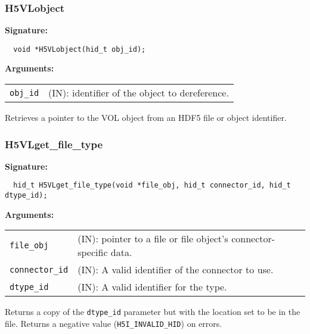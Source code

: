 \subsubsection{H5VLobject}
\begin{mdframed}[style=bgbox]
\textbf{Signature:}
\begin{lstlisting}
  void *H5VLobject(hid_t obj_id); 
\end{lstlisting}
\textbf{Arguments:}\\
\begin{tabular}{l p{13.5cm}}
 {\tt obj\_id} & (IN): identifier of the object to dereference.\\
\end{tabular}
\end{mdframed}
Retrieves a pointer to the VOL object from an HDF5 file or object identifier.
\bigskip


\subsubsection{H5VLget\_file\_type}
\begin{mdframed}[style=bgbox]
\textbf{Signature:}
\begin{lstlisting}
  hid_t H5VLget_file_type(void *file_obj, hid_t connector_id, hid_t dtype_id); 
\end{lstlisting}
\textbf{Arguments:}\\
\begin{tabular}{l p{13.5cm}}
 {\tt file\_obj} & (IN): pointer to a file or file object's connector-specific data.\\
 {\tt connector\_id} & (IN): A valid identifier of the connector to use.\\
 {\tt dtype\_id} & (IN): A valid identifier for the type.\\
\end{tabular}
\end{mdframed}
Returns a copy of the {\tt dtype\_id} parameter but with the location set to
be in the file. Returns a negative value ({\tt H5I\_INVALID\_HID}) on errors.
\bigskip


